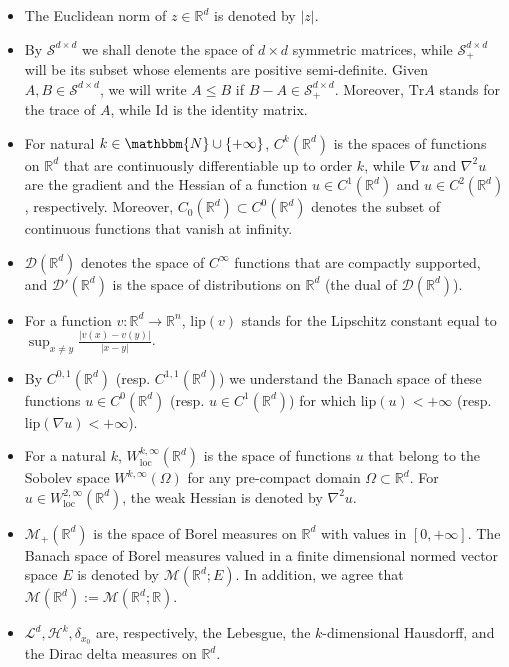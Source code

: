 \documentclass[11pt,letterpaper,reqno]{amsart}
\theoremstyle{definition}
\numberwithin{equation}{section}
\newcommand{\R}{\mathbb{R}}
\newcommand{\Rd}{\R^d}
\newcommand{\Ident}{{\mathrm{Id}}}
\newcommand{\Mes}{{\mathcal{M}}}
\newcommand{\Sddp}{{\mathcal{S}^{d\times d}_+}}
\newcommand{\tr}{{\mathrm{Tr}}}
\newcommand{\abs}[1]{{\left \lvert #1 \right \rvert}}
\newcommand{\Lip}{{\mathrm{lip}}}
\newcommand{\D}{\mathcal{D}}
\newcommand{\Ha}{\mathcal{H}}
\newcommand{\Sdd}{{\mathcal{S}^{d \times d}}}
\begin{document}
\begin{itemize}[leftmargin=1.2\parindent]
\item  The Euclidean norm of $z\in\R^d$ is denoted by $|z|$.

\item By $\Sdd$ we shall denote the space of $d\times d$ symmetric matrices, while $\Sddp$ will be its subset whose elements are positive semi-definite.
Given $A,B \in \Sdd$, we will write $A\le B$ if $B-A\in \Sddp$. Moreover, $\tr A$ stands for the trace of $A$, while $\Ident$ is the identity matrix.

\item  For natural $k\in \mathbbm{N} \cup\{+\infty\}$, $C^{k}(\Rd)$ is the  spaces of functions on $\Rd$ that are continuously differentiable up to order $k$, while $\nabla u$ and $\nabla^2 u$ are the gradient and the Hessian of a function $u\in C^1(\Rd)$ and $u\in C^2(\Rd)$, respectively. Moreover, $C_0(\Rd) \subset C^0(\Rd)$ denotes the subset of continuous functions that vanish at infinity.

\item  $\D(\Rd)$ denotes the  space of $C^\infty$ functions that are compactly supported, and $\D'(\Rd)$ is the space of distributions on $\Rd$ (the dual of $\D(\Rd)$).


\item  For a function $v:\Rd \to \R^n$, $\Lip(v)$ stands for the Lipschitz constant equal to $\sup_{x \neq y} \frac{\abs{v(x)-v(y)}}{\abs{x-y}}$.

\item  By $C^{0,1}(\Rd)$ (resp. $C^{1,1}(\Rd)$) we understand the Banach space of these functions $u \in C^0(\Rd)$  (resp.  $u\in C^1(\Rd)$) for which $\Lip(u)<+\infty$ (resp. $\Lip(\nabla u) <+\infty$).

\item For a natural $k$, $W^{k,\infty}_{\mathrm{loc}}(\Rd)$ is the space of functions $u$ that belong to the Sobolev space $W^{k,\infty}(\Omega)$ for any pre-compact domain $\Omega \subset \Rd$. For $u\in W^{2,\infty}_{\mathrm{loc}}(\Rd)$, the weak Hessian is denoted by $\nabla^2 u$.

\item $\Mes_+(\Rd)$ is the space of Borel measures on $\R^d$ with values in $[0,+\infty]$.  
  The Banach space of Borel measures valued in a finite dimensional normed vector space $E$ is denoted by $\Mes(\Rd;E)$. In addition, we agree that $\Mes(\Rd):=\Mes(\Rd;\R)$.

\item  $\mathcal{L}^d,\Ha^k, \delta_{x_0}$ are, respectively, the Lebesgue, the $k$-dimensional Hausdorff, and the Dirac delta measures on $\Rd$.
  

\end{itemize}
\end{document}
